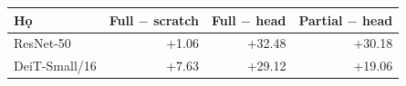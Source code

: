 \begin{tabular}{lrrr}
\toprule
Họ & Full $-$ scratch & Full $-$ head & Partial $-$ head\\
\midrule
ResNet-50 & +1.06 & +32.48 & +30.18\\
DeiT-Small/16 & +7.63 & +29.12 & +19.06\\
\bottomrule
\end{tabular}
